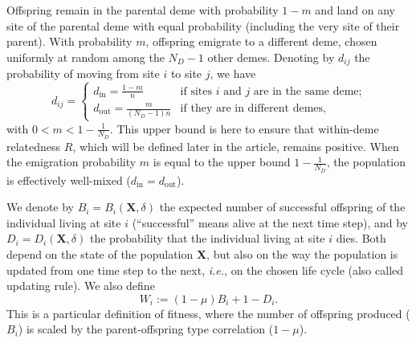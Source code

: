 \documentclass[11pt, letterpaper]{article}
\newcommand{\ie}{\textit{i.e.}}
\newcommand{\inn}{\textrm{in}}
\newcommand{\out}{\textrm{out}}
\newcommand{\din}{d_{\inn}}
\newcommand{\dout}{d_{\out}}
\newcommand{\ndemes}{N_D}
\newcommand{\selstr}{\delta}
\begin{document}
Offspring remain in the parental deme with probability $1-m$ and land on any site of the parental deme with equal probability (including the very site of their parent). With probability $m$, offspring emigrate to a different deme, chosen uniformly at random among the $\ndemes -1$ other demes. Denoting by $d_{ij}$ the probability of moving from site $i$ to site $j$, we have
\begin{equation}\label{eq:defD}
d_{ij} = \begin{cases}
 \din =  \frac{1-m}{n} & \textrm{if sites $i$ and $j$ are in the same deme;}\\
 \dout = \frac{m}{(\ndemes-1) n} & \textrm{if  they are in different demes,} 
\end{cases}
\end{equation}
%
with $0 < m < 1-\frac{1}{\ndemes}$. This upper bound is here to ensure that within-deme relatedness $R$, which will be defined later in the article, remains positive. When the emigration probability $m$ is equal to the upper bound $1-\frac{1}{\ndemes}$, the population is effectively well-mixed ($d_{\inn}=d_{\out}$).

We denote by $B_i = B_i(\mathbf{X}, \selstr)$ the expected number of successful offspring of the individual living at site $i$ (``successful'' means alive at the next time step), and by $D_i = D_i(\mathbf{X}, \selstr)$ the probability that the individual living at site $i$ dies. Both depend on the state of the population $\mathbf{X}$, but also on the way the population is updated from one time step to the next, \ie, on the chosen life cycle (also called updating rule). We also define
%
\begin{equation}\label{eq:defW}
W_i := (1-\mu) B_i + 1 - D_i.
\end{equation}
This is a particular definition of fitness, where the number of offspring produced ($B_i$) is scaled by the parent-offspring type correlation ($1-\mu$).
\end{document}
